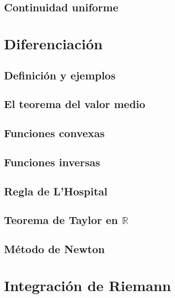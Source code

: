 \documentclass[12pt,]{krantz}
\theoremstyle{definition}
\theoremstyle{definition}
\theoremstyle{definition}
\theoremstyle{remark}
\begin{document}
\section{Continuidad uniforme}\label{continuidad-uniforme}

\chapter{Diferenciación}\label{diferenciacion}

\section{Definición y ejemplos}\label{definicion-y-ejemplos}

\section{El teorema del valor medio}\label{el-teorema-del-valor-medio}

\section{Funciones convexas}\label{funciones-convexas}

\section{Funciones inversas}\label{funciones-inversas}

\section{Regla de L'Hospital}\label{regla-de-lhospital}

\section{\texorpdfstring{Teorema de Taylor en
\(\mathbb{R}\)}{Teorema de Taylor en \textbackslash{}mathbb\{R\}}}\label{teorema-de-taylor-en-mathbbr}

\section{Método de Newton}\label{metodo-de-newton}

\chapter{Integración de Riemann}\label{integracion-de-riemann}
\end{document}
